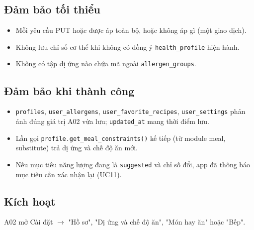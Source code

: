\subsection{Đảm bảo tối thiểu}
\begin{itemize}
\item Mỗi yêu cầu PUT hoặc được áp toàn bộ, hoặc không áp gì (một giao dịch).
\item Không lưu chỉ số cơ thể khi không có đồng ý {\small\texttt{health\_\allowbreak{}\allowbreak{}profile}} hiện hành.
\item Không có tập dị ứng nào chứa mã ngoài {\small\texttt{allergen\_\allowbreak{}\allowbreak{}groups}}.
\end{itemize}
\subsection{Đảm bảo khi thành công}
\begin{itemize}
\item {\small\texttt{profiles}}, {\small\texttt{user\_\allowbreak{}\allowbreak{}allergens}}, {\small\texttt{user\_\allowbreak{}\allowbreak{}favorite\_\allowbreak{}\allowbreak{}recipes}}, {\small\texttt{user\_\allowbreak{}\allowbreak{}settings}} phản ánh đúng giá trị A02 vừa lưu; {\small\texttt{updated\_\allowbreak{}\allowbreak{}at}} mang thời điểm lưu.
\item Lần gọi {\small\texttt{profile.\allowbreak{}get\_\allowbreak{}\allowbreak{}meal\_\allowbreak{}\allowbreak{}constraints()}} kế tiếp (từ module meal, substitute) trả dị ứng và chế độ ăn mới.
\item Nếu mục tiêu năng lượng đang là {\small\texttt{suggested}} và chỉ số đổi, app đã thông báo mục tiêu cần xác nhận lại (UC11).
\end{itemize}
\subsection{Kích hoạt}
A02 mở Cài đặt \ensuremath{\rightarrow} "Hồ sơ", "Dị ứng và chế độ ăn", "Món hay ăn" hoặc "Bếp".

